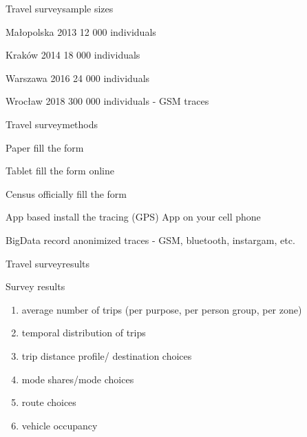 \documentclass[8pt]{beamer}
\begin{document}
\begin{frame}{Travel survey}{sample sizes}
	\begin{block}{Małopolska 2013}
		12 000 individuals	
	\end{block}
	\begin{block}{Kraków 2014}
		18 000 individuals	
	\end{block}
	
	\begin{block}{Warszawa 2016}
		24 000 individuals	
	\end{block}
	
	\begin{block}{Wrocław 2018}
		300 000 individuals	- GSM traces
	\end{block}
	
\end{frame}

\begin{frame}{Travel survey}{methods}
	\begin{block}{Paper}
		fill the form
	\end{block}
	
	\begin{block}{Tablet}
		fill the form online
	\end{block}
	
	\begin{block}{Census}
		officially fill the form
	\end{block}
	
	\begin{block}{App based}
		install the tracing (GPS) App on your cell phone
	\end{block}
	
	\begin{block}{BigData}
		record anonimized traces - GSM, bluetooth, instargam, etc.
	\end{block}
	
\end{frame}

\begin{frame}{Travel survey}{results}
	\begin{block}{Survey results}
		\begin{enumerate}
		\item average number of trips (per purpose, per person group, per zone)
		\item temporal distribution of trips
		\item trip distance profile/ destination choices
		\item mode shares/mode choices
		\item route choices
		\item vehicle occupancy
		\end{enumerate}	
	\end{block}	
\end{frame}
\end{document}
